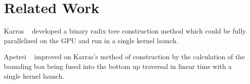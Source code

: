 \section{Related Work}
\label{sec:related_work}

Karras ~\cite{karras} developed a binary radix tree construction method which could be fully parallelized on the GPU and run in a single kernel launch. 

Apetrei ~\cite{lbvh} improved on Karras's method of construction by the calculation of the bounding box being fused into the bottom up traversal in linear time with a single kernel launch.
